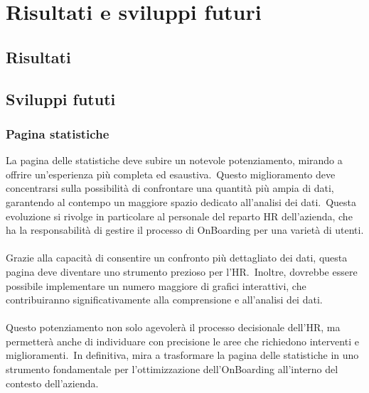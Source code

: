 \chapter{Risultati e sviluppi futuri}\label{chapter:formattazione}
%
%
\section{Risultati}\label{sec:cap_sec_subsec}
%
%
\section{Sviluppi fututi}\label{sec:cap_sec_subsec}
\subsection{Pagina statistiche}\label{sec:cap_sec_subsec}
La pagina delle statistiche deve subire un notevole potenziamento, mirando a offrire un'esperienza più completa ed esaustiva.\ 
Questo miglioramento deve concentrarsi sulla possibilità di confrontare una quantità più ampia di dati, 
garantendo al contempo un maggiore spazio dedicato all'analisi dei dati.\ 
Questa evoluzione si rivolge in particolare al personale del reparto HR dell'azienda, 
che ha la responsabilità di gestire il processo di OnBoarding per una varietà di utenti.
\\ \\
Grazie alla capacità di consentire un confronto più dettagliato dei dati, questa pagina deve diventare uno strumento prezioso per l'HR.\ 
Inoltre, dovrebbe essere possibile implementare un numero maggiore di grafici interattivi, che contribuiranno significativamente 
alla comprensione e all'analisi dei dati.
\\ \\
Questo potenziamento non solo agevolerà il processo decisionale dell'HR, ma permetterà anche di individuare con precisione le aree 
che richiedono interventi e miglioramenti.\ In definitiva, mira a trasformare la pagina delle statistiche in uno strumento 
fondamentale per l'ottimizzazione dell'OnBoarding all'interno del contesto dell'azienda.
%
